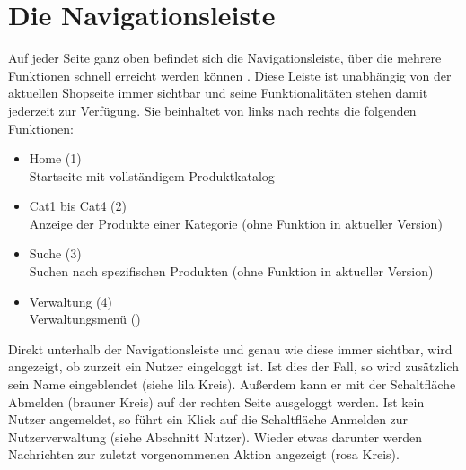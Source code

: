 \section{Die Navigationsleiste}
Auf jeder Seite ganz oben befindet sich die Navigationsleiste, über die mehrere Funktionen schnell erreicht werden können . Diese Leiste ist unabhängig von der aktuellen Shopseite immer sichtbar und seine Funktionalitäten stehen damit jederzeit zur Ver\-fü\-gung. Sie beinhaltet von links nach rechts die folgenden Funktionen:
\begin{itemize}
  \item Home (1) \\
        Startseite mit vollständigem Produktkatalog
  \vspace*{-0.5em}
  \item Cat1 bis Cat4 (2) \\
        Anzeige der Produkte einer Kategorie (ohne Funktion in aktueller Version)
  \vspace*{-0.5em}
  \item Suche (3) \\
        Suchen nach spezifischen Produkten (ohne Funktion in aktueller Version)
  \vspace*{-0.5em}
  \item Verwaltung (4) \\
        Verwaltungsmenü ()
\end{itemize}
Direkt unterhalb der Navigationsleiste und genau wie diese immer sichtbar, wird angezeigt, ob zurzeit ein Nutzer eingeloggt ist. Ist dies der Fall, so wird zusätzlich sein Name eingeblendet  (siehe lila Kreis). Außerdem  kann er mit der Schaltfläche Abmelden (brauner Kreis) auf der rechten Seite ausgeloggt werden.  Ist kein Nutzer angemeldet, so führt ein Klick auf die Schaltfläche Anmelden zur Nutzerverwaltung (siehe Abschnitt Nutzer). 
Wieder etwas darunter werden Nachrichten zur zuletzt vorgenommenen Aktion angezeigt (rosa Kreis).

